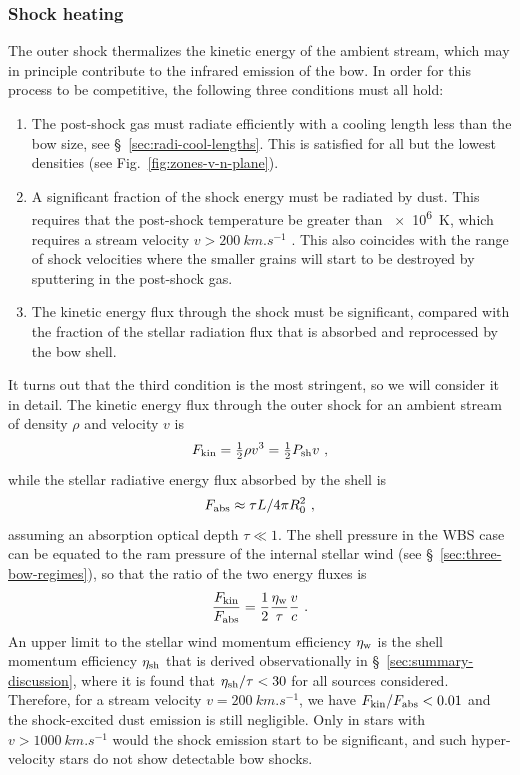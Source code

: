 \subsubsection{Shock heating}
\newcommand\kin{\ensuremath{_{\text{kin}}}}
The outer shock thermalizes the kinetic energy of the ambient stream,
which may in principle contribute to the infrared emission of the bow.
In order for this process to be competitive, the following three
conditions must all hold:
\begin{enumerate}[1.]
\item The post-shock gas must radiate efficiently with a cooling
  length less than the bow size, see \S~\ref{sec:radi-cool-lengths}.
  This is satisfied for all but the lowest densities (see
  Fig.~\ref{fig:zones-v-n-plane}).
\item A significant fraction of the shock energy must be radiated by
  dust.  This requires that the post-shock temperature be greater than
  \SI{e6}{K}, which requires a stream velocity
  \(v > \SI{200}{km.s^{-1}}\) \citep{Draine:1981a}.  This also
  coincides with the range of shock velocities where the smaller
  grains will start to be destroyed by sputtering in the post-shock
  gas.
\item The kinetic energy flux through the shock must be significant,
  compared with the fraction of the stellar radiation flux that is
  absorbed and reprocessed by the bow shell.
\end{enumerate}
It turns out that the third condition is the most stringent, so we
will consider it in detail.  The kinetic energy flux through the outer shock for an ambient stream of density \(\rho\) and velocity \(v\) is
\begin{equation}
  \label{eq:Fkin}
  F_{\text{kin}} = \tfrac12 \rho v^3 = \tfrac12 P_{\text{sh}} v \ , 
\end{equation}
while the stellar radiative energy flux absorbed by the shell is
\begin{equation}
  \label{eq:Ftrap}
  F_{\text{abs}} \approx \tau L / 4 \pi R_0^2 \ ,
\end{equation}
assuming an absorption optical depth \(\tau \ll 1\). The shell
pressure in the WBS case can be equated to the ram pressure of the
internal stellar wind (see \S~\ref{sec:three-bow-regimes}), so that
the ratio of the two energy fluxes is
\begin{equation}
  \label{eq:F-ratio-shock}
  \frac{F\ke}{F\trap} = \frac12 \frac{\eta\wind}{\tau} \frac{v}{c} \ .
\end{equation}
An upper limit to the stellar wind momentum efficiency \(\eta_{\text{w}}\)
is the shell momentum efficiency \(\eta_{\text{sh}}\) that is derived
observationally in \S~\ref{sec:summary-discussion}, where it is found
that \(\eta_{\text{sh}} / \tau < 30\) for all sources considered.  Therefore,
for a stream velocity \(v = \SI{200}{km.s^{-1}}\), we have
\(F_{\text{kin}}/F_{\text{abs}} < 0.01\) and the shock-excited dust emission is still
negligible.  Only in stars with \(v > \SI{1000}{km.s^{-1}}\) would the
shock emission start to be significant, and such hyper-velocity stars
\citep{Brown:2015a} do not show detectable bow shocks.

